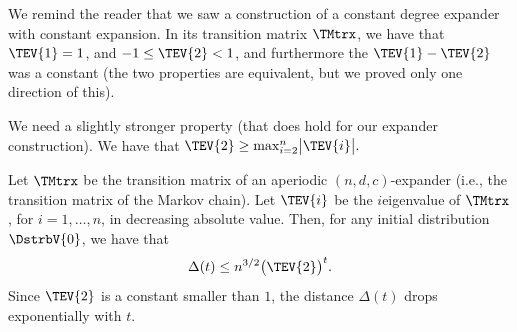 We remind the reader that we saw a construction of a constant degree
expander with constant expansion. In its transition matrix $\TMtrx$,
we have that $\TEV{1} = 1$, and $-1 \leq \TEV{2} <1$, and furthermore
the  $\TEV{1} - \TEV{2}$ was a constant (the two
properties are equivalent, but we proved only one direction of this).

We need a slightly stronger property (that does hold for our expander
construction). We have that
\begin{math}
    \TEV{2} \geq \max_{i=2}^n \bigl|\TEV{i}\bigr|.
\end{math}


\begin{theorem}
    Let $\TMtrx$ be the transition matrix of an aperiodic
    $(n,d,c)$-expander (i.e., the transition matrix of the Markov
    chain).  Let $\TEV{i}$ be the $i$\th eigenvalue of $\TMtrx$, for
    $i=1,\ldots, n$, in decreasing absolute value. Then, for any
    initial distribution $\DstrbV{0}$, we have that
    \begin{equation*}
        \Delta(t) \leq n^{3/2} \bigl( \TEV{2} \bigr)^t.
    \end{equation*}
    Since $\TEV{2}$ is a constant smaller than $1$, the distance
    $\Delta(t)$ drops exponentially with $t$.
\end{theorem}
